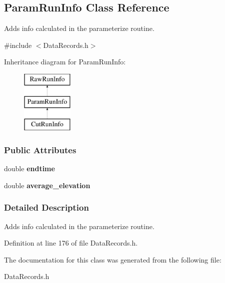 \hypertarget{classParamRunInfo}{
\subsection{ParamRunInfo Class Reference}
\label{classParamRunInfo}
}


Adds info calculated in the parameterize routine.  




{\ttfamily \#include $<$DataRecords.h$>$}

Inheritance diagram for ParamRunInfo:\begin{figure}[H]
\begin{center}
\leavevmode
\includegraphics[height=3.000000cm]{classParamRunInfo}
\end{center}
\end{figure}
\subsubsection*{Public Attributes}
\begin{DoxyCompactItemize}
\item 
\hypertarget{classParamRunInfo_af44ec8865cebdc749568d36302e4e900}{
double {\bfseries endtime}}
\label{classParamRunInfo_af44ec8865cebdc749568d36302e4e900}

\item 
\hypertarget{classParamRunInfo_abb72bf8780b2d26bc87fc0796ff35870}{
double {\bfseries average\_\-elevation}}
\label{classParamRunInfo_abb72bf8780b2d26bc87fc0796ff35870}

\end{DoxyCompactItemize}


\subsubsection{Detailed Description}
Adds info calculated in the parameterize routine. 

Definition at line 176 of file DataRecords.h.



The documentation for this class was generated from the following file:\begin{DoxyCompactItemize}
\item 
DataRecords.h\end{DoxyCompactItemize}
